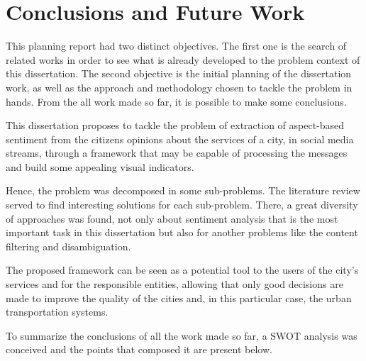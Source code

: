 \chapter{Conclusions and Future Work} \label{chap:conclusions}

This planning report had two distinct objectives. The first one is the search of related works in order to see what is already developed to the problem context of this dissertation. The second objective is the initial planning of the dissertation work, as well as the approach and methodology chosen to tackle the problem in hands. From the all work made so far, it is possible to make some conclusions.

This dissertation proposes to tackle the problem of extraction of aspect-based sentiment from the citizens opinions about the services of a city, in social media streams, through a framework that may be capable of processing the messages and build some appealing visual indicators.

Hence, the problem was decomposed in some sub-problems. The literature review served to find interesting solutions for each sub-problem. There, a great diversity of approaches was found, not only about sentiment analysis that is the most important task in this dissertation but also for another problems like the content filtering and disambiguation.

The proposed framework can be seen as a potential tool to the users of the city's services and for the responsible entities, allowing that only good decisions are made to improve the quality of the cities and, in this particular case, the urban transportation systems. 

To summarize the conclusions of all the work made so far, a SWOT analysis was conceived and the points that composed it are present below.

